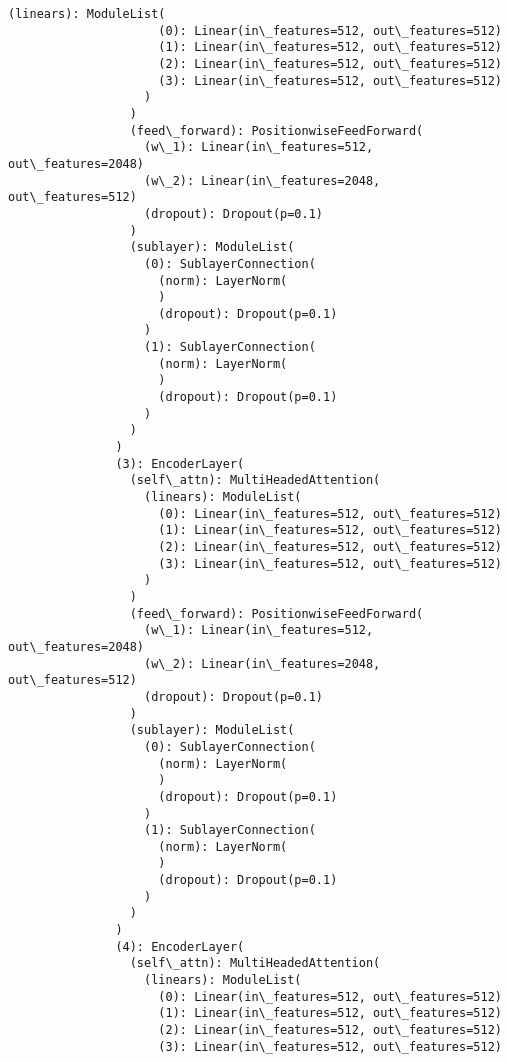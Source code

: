 \documentclass[11pt]{article}
\begin{document}
\begin{Verbatim}[commandchars=\\\{\}]
                   (linears): ModuleList(
                     (0): Linear(in\_features=512, out\_features=512)
                     (1): Linear(in\_features=512, out\_features=512)
                     (2): Linear(in\_features=512, out\_features=512)
                     (3): Linear(in\_features=512, out\_features=512)
                   )
                 )
                 (feed\_forward): PositionwiseFeedForward(
                   (w\_1): Linear(in\_features=512, out\_features=2048)
                   (w\_2): Linear(in\_features=2048, out\_features=512)
                   (dropout): Dropout(p=0.1)
                 )
                 (sublayer): ModuleList(
                   (0): SublayerConnection(
                     (norm): LayerNorm(
                     )
                     (dropout): Dropout(p=0.1)
                   )
                   (1): SublayerConnection(
                     (norm): LayerNorm(
                     )
                     (dropout): Dropout(p=0.1)
                   )
                 )
               )
               (3): EncoderLayer(
                 (self\_attn): MultiHeadedAttention(
                   (linears): ModuleList(
                     (0): Linear(in\_features=512, out\_features=512)
                     (1): Linear(in\_features=512, out\_features=512)
                     (2): Linear(in\_features=512, out\_features=512)
                     (3): Linear(in\_features=512, out\_features=512)
                   )
                 )
                 (feed\_forward): PositionwiseFeedForward(
                   (w\_1): Linear(in\_features=512, out\_features=2048)
                   (w\_2): Linear(in\_features=2048, out\_features=512)
                   (dropout): Dropout(p=0.1)
                 )
                 (sublayer): ModuleList(
                   (0): SublayerConnection(
                     (norm): LayerNorm(
                     )
                     (dropout): Dropout(p=0.1)
                   )
                   (1): SublayerConnection(
                     (norm): LayerNorm(
                     )
                     (dropout): Dropout(p=0.1)
                   )
                 )
               )
               (4): EncoderLayer(
                 (self\_attn): MultiHeadedAttention(
                   (linears): ModuleList(
                     (0): Linear(in\_features=512, out\_features=512)
                     (1): Linear(in\_features=512, out\_features=512)
                     (2): Linear(in\_features=512, out\_features=512)
                     (3): Linear(in\_features=512, out\_features=512)

\end{Verbatim}
\end{document}
